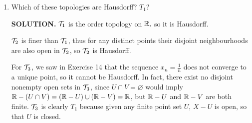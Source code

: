 \documentclass{article}
\begin{document}
\begin{enumerate}
\begin{enumerate}
        {\bf SOLUTION.} In the standard topology, if $x \in (-\infty, 0)$ then $(-\infty, 0)$ is a neighbourhood of $x$ that does not intersect $K$, and similarly for $x \in (1, \infty)$. If $x \in (0, 1) - K$, then let $m, n$ be consecutive natural numbers such that $\frac1n < x < \frac1m$. Then $(\frac1n, \frac1m)$ is a neighbourhood of $x$ that does not intersect $K$. However, every basis element containing $0$ contains $\frac1n$ for all $n$ greater than some $N$, so $0$ is the unique limit point of $K$, and thus $\overline{K} = \{0\} \cup K$.
        
        $K$ is closed in $\reals_K$ since its complement $\reals - K$ is open. Thus $\overline{K} = K$.

        Given any $x \in \reals$ in the finite complement topology and any neighbourhood $U$ of $x$, $\reals - U$ is finite by definition. Thus $\reals - U$ cannot contain $K$, meaning $K$ intersects $U$. Thus every neighbourhood of any point intersects $K$, and thus $\overline{K} = \reals$.

        For $\topo_4,$ by similar reasoning as $\topo_1$, $(-\infty, 0) \cup( (0, 1) - K )\cup (1, \infty) \notin \overline{K}$. For $0$, we now have a neighbourhood $(-\infty, 0]$ of $0$ that does not intersect $K$, hence $\overline{K} = K$.

        For any $x \in (-\infty, 0)$, $(-\infty, 0)$ is a neighbourhood of $x$ in $\topo_5$ that does not intersect $K$. However, for any $x \in [0, \infty)$, any basis element $(-\infty, a)$ containing $x$ must satisfy $0 < a$, and thus intersects $K$. Therefore $\overline{K} = [0, \infty)$. $\Box$
        
        \item Which of these topologies are Hausdorff? $T_1$?

        {\bf SOLUTION.} $\topo_1$ is the order topology on $\mathbb{R},$ so it is Hausdorff.

        $\mathcal{T}_2$ is finer than $\topo_1$, thus for any distinct points their disjoint neighbourhoods are also open in $\mathcal{T}_2$, so $\mathcal{T}_2$ is Hausdorff.

        For $\mathcal{T}_3$, we saw in Exercise 14 that the sequence $x_n = \frac1n$ does not converge to a unique point, so it cannot be Hausdorff. In fact, there exist no disjoint nonempty open sets in $\mathcal{T}_3$, since $U \cap V = \varnothing$ would imply $\mathbb{R} - (U \cap V) =( \mathbb{R} - U) \cup (\mathbb{R} - V) = \mathbb{R}$, but $\reals - U$ and $\mathbb{R} - V$ are both finite. $\mathcal{T}_3$ is clearly $T_1$ because given any finite point set $U$, $X - U$ is open, so that $U$ is closed.


\end{enumerate}
\end{enumerate}
\end{document}
